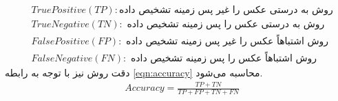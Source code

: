 \begin{enumerate}
\begin{equation}
\begin{split}
			&TruePositive(TP) :\textit{روش به درستی عکس را غیر پس زمینه تشخیص داده}\\
			&TrueNegative(TN) :\textit{ روش به درستی عکس را پس زمینه تشخیص داده}\\
			&FalsePositive(FP) :\textit{ روش اشتباهاً عکس را غیر پس زمینه تشخیص داده}\\
			&FalseNegative(FN) :\textit{ روش اشتباهاً عکس را پس زمینه تشخیص داده}
		\end{split}
	\end{equation}
    دقت روش نیز با توجه به رابطه \ref{eqn:accuracy} محاسبه می‌شود.
   	\begin{equation}
    	\label{eqn:accuracy}
    	\begin{split}
    		&Accuracy = \frac{TP + TN}{TP + FP + TN + FN}\\
    	\end{split}
    \end{equation}
    

\end{enumerate}
